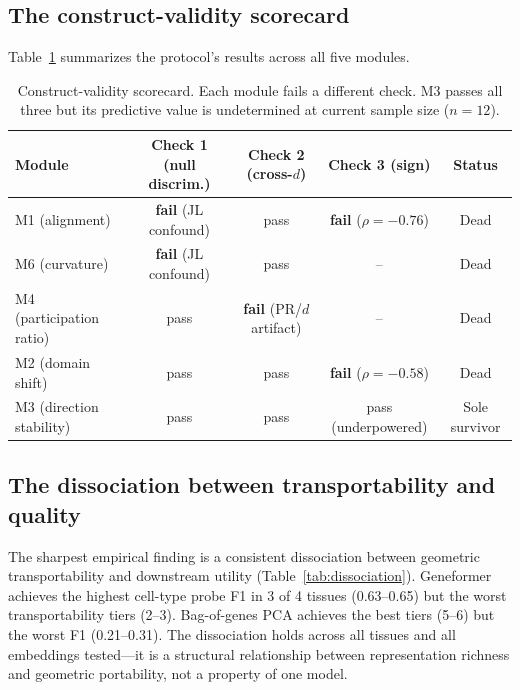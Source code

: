 \documentclass[9pt,lineno]{elife}
\begin{document}
\subsection{The construct-validity scorecard}

Table~\ref{tab:scorecard} summarizes the protocol's results across all five modules.

\begin{table}[t]
\centering
\caption{Construct-validity scorecard. Each module fails a different check. M3 passes all three but its predictive value is undetermined at current sample size ($n = 12$).}
\label{tab:scorecard}
\small
\begin{tabular}{@{}lcccc@{}}
\toprule
Module & Check 1 (null discrim.) & Check 2 (cross-$d$) & Check 3 (sign) & Status \\
\midrule
M1 (alignment) & \textbf{fail} (JL confound) & pass & \textbf{fail} ($\rho = -0.76$) & Dead \\
M6 (curvature) & \textbf{fail} (JL confound) & pass & -- & Dead \\
M4 (participation ratio) & pass & \textbf{fail} (PR/$d$ artifact) & -- & Dead \\
M2 (domain shift) & pass & pass & \textbf{fail} ($\rho = -0.58$) & Dead \\
M3 (direction stability) & pass & pass & pass (underpowered) & Sole survivor \\
\bottomrule
\end{tabular}
\end{table}

\subsection{The dissociation between transportability and quality}

The sharpest empirical finding is a consistent dissociation between geometric transportability and downstream utility (Table~\ref{tab:dissociation}). Geneformer achieves the highest cell-type probe F1 in 3 of 4 tissues (0.63--0.65) but the worst transportability tiers (2--3). Bag-of-genes PCA achieves the best tiers (5--6) but the worst F1 (0.21--0.31). The dissociation holds across all tissues and all embeddings tested---it is a structural relationship between representation richness and geometric portability, not a property of one model.
\end{document}

